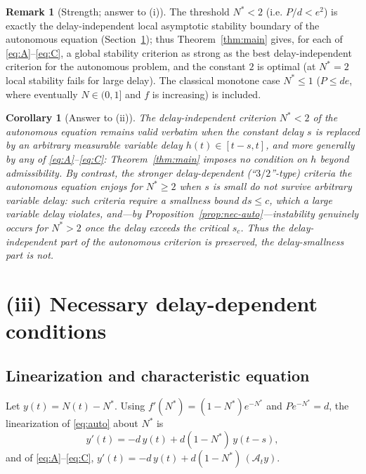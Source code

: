 \documentclass[12pt]{article}
\newtheorem{corollary}{Corollary}
\theoremstyle{definition}
\newtheorem{remark}{Remark}
\begin{document}
\begin{remark}[Strength; answer to (i)]
The threshold $N^*<2$ (i.e. $P/d<e^2$) is exactly the delay-independent local
asymptotic stability boundary of the autonomous equation
(Section~\ref{sec:nec}); thus Theorem~\ref{thm:main} gives, for each of
\eqref{eq:A}--\eqref{eq:C}, a global stability criterion as strong as the best
delay-independent criterion for the autonomous problem, and the constant $2$ is
optimal (at $N^*=2$ local stability fails for large delay). The classical
monotone case $N^*\le1$ ($P\le de$, where eventually $N\in(0,1]$ and $f$ is
increasing) is included.
\end{remark}

\begin{corollary}[Answer to (ii)]\label{cor:ii}
The delay-independent criterion $N^*<2$ of the autonomous equation remains valid
\emph{verbatim} when the constant delay $s$ is replaced by an arbitrary
measurable variable delay $h(t)\in[t-s,t]$, and more generally by any of
\eqref{eq:A}--\eqref{eq:C}: Theorem~\ref{thm:main} imposes no condition on $h$
beyond admissibility. By contrast, the stronger delay-dependent (``$3/2$''-type)
criteria the autonomous equation enjoys for $N^*\ge2$ when $s$ is small do
\emph{not} survive arbitrary variable delay: such criteria require a smallness
bound $ds\le c$, which a large variable delay violates, and—by
Proposition~\ref{prop:nec-auto}—instability genuinely occurs for $N^*>2$ once
the delay exceeds the critical $s_c$. Thus the delay-independent part of the
autonomous criterion is preserved, the delay-smallness part is not.
\end{corollary}

\section{(iii) Necessary delay-dependent conditions}\label{sec:nec}

\subsection{Linearization and characteristic equation}

Let $y(t)=N(t)-N^*$. Using $f'(N^*)=(1-N^*)e^{-N^*}$ and $Pe^{-N^*}=d$, the
linearization of \eqref{eq:auto} about $N^*$ is
\begin{equation}\label{eq:lin}
  y'(t)=-d\,y(t)+d(1-N^*)\,y(t-s),
\end{equation}
and of \eqref{eq:A}--\eqref{eq:C}, $y'(t)=-d\,y(t)+d(1-N^*)\,(\mathcal A_t y)$.
\end{document}
